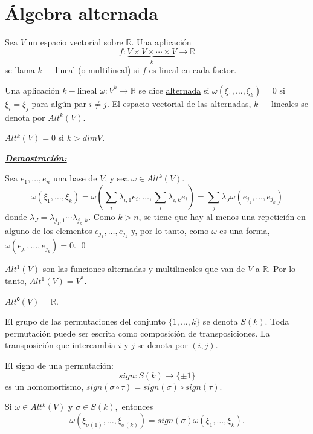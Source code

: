 \chapter{Álgebra alternada}

Sea $V$ un espacio vectorial sobre $\mathbb{R}$. Una aplicación
$$ f: \underbrace{V\times V \times \cdots \times V}_{k} \rightarrow \mathbb{R}$$
se llama $k-$ lineal (o multilineal) si $f$ es lineal en cada factor.

\begin{Def}
Una aplicación $k-$lineal $\omega: V^k \rightarrow \mathbb{R}$ se dice \underline{alternada} si $\omega (\xi_1,\dots,\xi_k)=0$ si $\xi_i=\xi_j$ para algún par $i\neq j$. El espacio vectorial de las alternadas, $k-$ lineales se denota por $Alt^k(V)$. 
\end{Def}

\begin{nota}
  $Alt^k(V)=0$ si $k>dim V$.

  \underline{\textbf{\textit{Demostración:}}}

  Sea $e_1,\dots,e_n$ una base de $V$, y sea $\omega \in Alt^k(V)$.
  $$\omega(\xi_1,\dots,\xi_k)=\omega(\sum_i \lambda_{i,1}e_i,\dots,\sum_i \lambda_{i,k}e_i)=\sum_j\lambda_J\omega (e_{j_1},\dots,e_{j_k})$$
  donde $\lambda_J=\lambda_{j_1,1}\cdots \lambda_{j_k,k}$. Como $k>n$, se tiene que hay al menos una repetición en alguno de los elementos $e_{j_1},\dots,e_{j_k}$ y, por lo tanto, como $\omega$ es una forma, $\omega (e_{j_1},\dots,e_{j_k})=0$.  \qed
\end{nota}

\begin{nota}
  \begin{itemize*}
  \item $Alt^1(V)$ son las funciones alternadas y multilineales que van de $V$ a $\mathbb{R}$. Por lo tanto, $Alt^1(V)=V^*$.
  \item $Alt⁰(V)= \mathbb{R}$. 
  \end{itemize*}
\end{nota}

El grupo de las permutaciones del conjunto $\{ 1,\dots, k \}$ se denota $S(k)$. Toda permutación puede ser escrita como composición de transposiciones. La transposición que intercambia $i$ y $j$ se denota por $(i,j)$.

El signo de una permutación:
$$sign:S(k) \rightarrow \{\pm 1\}$$
es un homomorfismo, $sign(\sigma \circ \tau )=sign(\sigma) \circ sign(\tau)$.

\begin{Lem}\label{sec:lema1}
  Si $\omega \in Alt^k(V)$ y $\sigma \in S(k),$ entonces
  $$\omega(\xi_{\sigma(1)},\dots, \xi_{\sigma(k)})=sign(\sigma) \omega (\xi_1,\dots,\xi_k). $$
\end{Lem}

